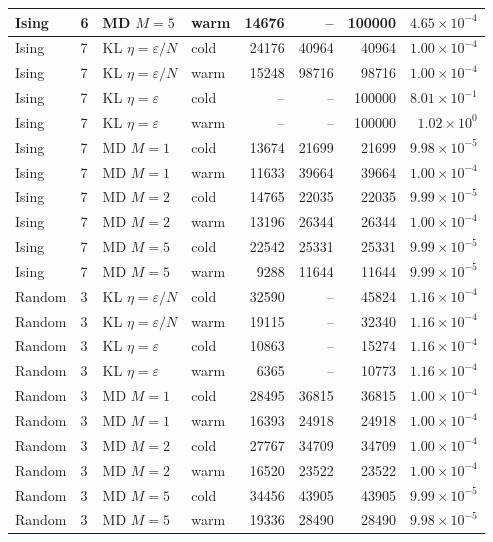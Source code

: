 \begin{table}[t]
\begin{tabular}{llllrrrr}
Ising & 6 & MD $M=5$ & warm & 14676 & -- & 100000 & $4.65\times 10^{-4}$ \\
\midrule
Ising & 7 & KL $\eta=\varepsilon/N$ & cold & 24176 & 40964 & 40964 & $1.00\times 10^{-4}$ \\
Ising & 7 & KL $\eta=\varepsilon/N$ & warm & 15248 & 98716 & 98716 & $1.00\times 10^{-4}$ \\
Ising & 7 & KL $\eta=\varepsilon$ & cold & -- & -- & 100000 & $8.01\times 10^{-1}$ \\
Ising & 7 & KL $\eta=\varepsilon$ & warm & -- & -- & 100000 & $1.02\times 10^{0}$ \\
Ising & 7 & MD $M=1$ & cold & 13674 & 21699 & 21699 & $9.98\times 10^{-5}$ \\
Ising & 7 & MD $M=1$ & warm & 11633 & 39664 & 39664 & $1.00\times 10^{-4}$ \\
Ising & 7 & MD $M=2$ & cold & 14765 & 22035 & 22035 & $9.99\times 10^{-5}$ \\
Ising & 7 & MD $M=2$ & warm & 13196 & 26344 & 26344 & $1.00\times 10^{-4}$ \\
Ising & 7 & MD $M=5$ & cold & 22542 & 25331 & 25331 & $9.99\times 10^{-5}$ \\
Ising & 7 & MD $M=5$ & warm & 9288 & 11644 & 11644 & $9.99\times 10^{-5}$ \\
\midrule
Random & 3 & KL $\eta=\varepsilon/N$ & cold & 32590 & -- & 45824 & $1.16\times 10^{-4}$ \\
Random & 3 & KL $\eta=\varepsilon/N$ & warm & 19115 & -- & 32340 & $1.16\times 10^{-4}$ \\
Random & 3 & KL $\eta=\varepsilon$ & cold & 10863 & -- & 15274 & $1.16\times 10^{-4}$ \\
Random & 3 & KL $\eta=\varepsilon$ & warm & 6365 & -- & 10773 & $1.16\times 10^{-4}$ \\
Random & 3 & MD $M=1$ & cold & 28495 & 36815 & 36815 & $1.00\times 10^{-4}$ \\
Random & 3 & MD $M=1$ & warm & 16393 & 24918 & 24918 & $1.00\times 10^{-4}$ \\
Random & 3 & MD $M=2$ & cold & 27767 & 34709 & 34709 & $1.00\times 10^{-4}$ \\
Random & 3 & MD $M=2$ & warm & 16520 & 23522 & 23522 & $1.00\times 10^{-4}$ \\
Random & 3 & MD $M=5$ & cold & 34456 & 43905 & 43905 & $9.99\times 10^{-5}$ \\
Random & 3 & MD $M=5$ & warm & 19336 & 28490 & 28490 & $9.98\times 10^{-5}$ \\
\midrule

\end{tabular}
\end{table}
